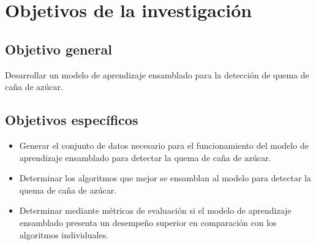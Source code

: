 \section{Objetivos de la investigación}
\subsection{Objetivo general}
Desarrollar un modelo de aprendizaje ensamblado para la detección de quema de caña de azúcar.  
\subsection{Objetivos específicos}
\begin{itemize}
    \item Generar el conjunto de datos necesario para el funcionamiento del modelo de aprendizaje ensamblado para detectar la quema de caña de azúcar.
    \item Determinar los algoritmos que mejor se ensamblan al modelo para detectar la quema de caña de azúcar.
    \item Determinar mediante métricas de evaluación si el modelo de aprendizaje ensamblado presenta un desempeño superior en comparación con los algoritmos individuales.
\end{itemize}
